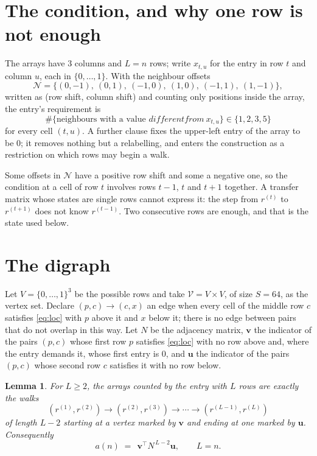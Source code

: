 \documentclass[11pt,a4paper]{article}
\theoremstyle{plain}
\newtheorem{lemma}[theorem]{Lemma}
\theoremstyle{definition}
\begin{document}
\section{The condition, and why one row is not enough}

The arrays have $3$ columns and $L=n$ rows; write $x_{t,u}$ for the entry in
row $t$ and column $u$, each in $\{0,\dots,1\}$. With the neighbour offsets
\[
\mathcal N=\{(0,-1),\ (0,1),\ (-1,0),\ (1,0),\ (-1,1),\ (1,-1)\},
\]
written as (row shift, column shift) and counting only positions inside the array, the
entry's requirement is
\begin{equation}\label{eq:loc}
\#\{\text{neighbours with a value }different from\ x_{t,u}\}\in\{1,2,3,5\}
\end{equation}
for every cell $(t,u)$. A further clause fixes the upper-left entry of the array to be $0$; it removes nothing but a relabelling, and enters the construction as a restriction on which rows may begin a walk.

Some offsets in $\mathcal N$ have a positive row shift and some a negative one, so the
condition at a cell of row $t$ involves rows $t-1$, $t$ and $t+1$ together. A transfer
matrix whose states are single rows cannot express it: the step from $r^{(t)}$ to
$r^{(t+1)}$ does not know $r^{(t-1)}$. Two consecutive rows are enough, and that is
the state used below.

\section{The digraph}

Let $V=\{0,\dots,1\}^{3}$ be the possible rows and take
$\mathcal V=V\times V$, of size $S=64$, as the vertex set. Declare $(p,c)\to(c,x)$ an edge
when every cell of the middle row $c$ satisfies \eqref{eq:loc} with $p$ above it and $x$
below it; there is no edge between pairs that do not overlap in this way. Let $N$ be the
adjacency matrix, $\mathbf{v}$ the indicator of the pairs $(p,c)$ whose first row $p$
satisfies \eqref{eq:loc} with no row above and, where the entry demands it, whose first entry is $0$, and $\mathbf{u}$ the indicator of
the pairs $(p,c)$ whose second row $c$ satisfies it with no row below.

\begin{lemma}\label{lem:walk}
For $L\ge2$, the arrays counted by the entry with $L$ rows are exactly the walks
\[
(r^{(1)},r^{(2)})\to(r^{(2)},r^{(3)})\to\cdots\to(r^{(L-1)},r^{(L)})
\]
of length $L-2$ starting at a vertex marked by $\mathbf{v}$ and ending at one marked by
$\mathbf{u}$. Consequently
\[
a(n)\;=\;\,\mathbf{v}^{\!\top}N^{\,L-2}\mathbf{u},\qquad L=n .
\]
\end{lemma}
\end{document}
